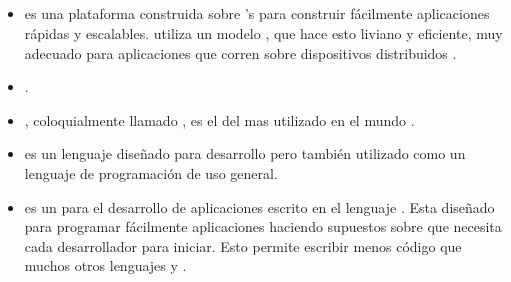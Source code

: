\subsection{\serverSide}
\begin{itemize}
	\item \textbf{\nodejsNAME} es una plataforma construida sobre \chrome's \javaScriptNAME \runtime para construir fácilmente aplicaciones \network rápidas y escalables. \nodejsNAME utiliza un modelo \eventdrivenPL, \nonbloking  {} que hace esto liviano y eficiente, muy adecuado para aplicaciones \dataintensive \realTimeINT que corren sobre dispositivos distribuidos \cite{technology_nodejs}.
	
	\item \textbf{\meteor}.
	
	\item \textbf{\apacheNAME} \httpNAME \serverAS, coloquialmente llamado \apacheNAME, es el \software del \serverAS \web mas utilizado en el mundo \cite{online_technology_apache}.
	
	\item \textbf{\phpNAME} es un lenguaje \scripting \serverSide diseñado para desarrollo \web pero también utilizado como un lenguaje de programación de uso general\cite{online_technology_php}.
	
	\item \textbf{\rubyonrails} es un \framework para el desarrollo de aplicaciones \web escrito en el lenguaje \ruby. Esta diseñado para programar fácilmente aplicaciones \web haciendo supuestos sobre que necesita cada desarrollador para iniciar. Esto permite escribir menos código que muchos otros lenguajes y \frameworks \cite{online_technology_rubyonrails}.
	

\end{itemize}
